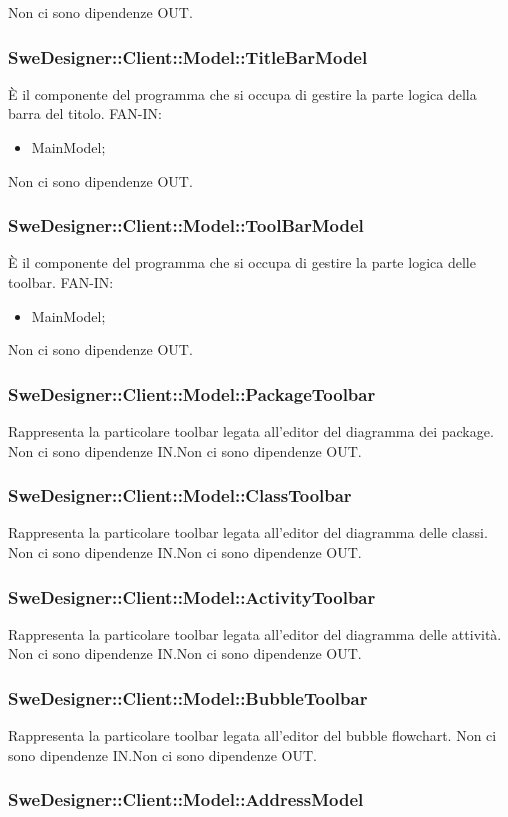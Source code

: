 \documentclass[../PianoDiQualifica.tex]{subfiles}
\begin{document}
		Non ci sono dipendenze OUT.\subsubsection{SweDesigner::Client::Model::TitleBarModel}
		È il componente del programma che si occupa di gestire la parte logica della barra del titolo.
		FAN-IN:
		\begin{itemize}
			\item MainModel;
		\end{itemize}
		Non ci sono dipendenze OUT.\subsubsection{SweDesigner::Client::Model::ToolBarModel}
		È il componente del programma che si occupa di gestire la parte logica delle toolbar.
		FAN-IN:
		\begin{itemize}
			\item MainModel;
		\end{itemize}
		Non ci sono dipendenze OUT.\subsubsection{SweDesigner::Client::Model::PackageToolbar}
		Rappresenta la particolare toolbar legata all’editor del diagramma dei package.
		Non ci sono dipendenze IN.Non ci sono dipendenze OUT.\subsubsection{SweDesigner::Client::Model::ClassToolbar}
		Rappresenta la particolare toolbar legata all’editor del diagramma delle classi.
		Non ci sono dipendenze IN.Non ci sono dipendenze OUT.\subsubsection{SweDesigner::Client::Model::ActivityToolbar}
		Rappresenta la particolare toolbar legata all’editor del diagramma delle attività.
		Non ci sono dipendenze IN.Non ci sono dipendenze OUT.\subsubsection{SweDesigner::Client::Model::BubbleToolbar}
		Rappresenta la particolare toolbar legata all’editor del bubble flowchart.
		Non ci sono dipendenze IN.Non ci sono dipendenze OUT.\subsubsection{SweDesigner::Client::Model::AddressModel}
\end{document}
